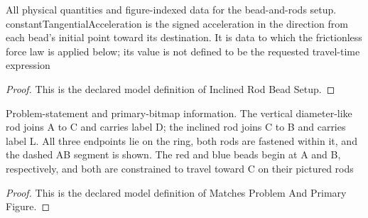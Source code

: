 \begin{definition}
  \label{def:physics:phyx-mini-0675:phyxminiproblems-problemphyxmini0675-inclinedrodbeadsetup}
  All physical quantities and figure-indexed data for the bead-and-rods setup. constantTangentialAcceleration is the signed acceleration in the direction from each bead's initial point toward its destination. It is data to which the frictionless force law is applied below; its value is not defined to be the requested travel-time expression
\end{definition}
\begin{proof}
  This is the declared model definition of Inclined Rod Bead Setup.
\end{proof}
\begin{definition}
  \label{def:physics:phyx-mini-0675:phyxminiproblems-problemphyxmini0675-matchesproblemandprimaryfigure}
  Problem-statement and primary-bitmap information. The vertical diameter-like rod joins A to C and carries label D; the inclined rod joins C to B and carries label L. All three endpoints lie on the ring, both rods are fastened within it, and the dashed AB segment is shown. The red and blue beads begin at A and B, respectively, and both are constrained to travel toward C on their pictured rods
\end{definition}
\begin{proof}
  This is the declared model definition of Matches Problem And Primary Figure.
\end{proof}
